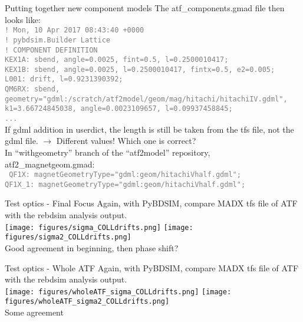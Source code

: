 \documentclass[xcolor={dvipsnames}]{beamer}
\begin{document}
\begin{frame}{Putting together new component models}
The atf\_components.gmad file then looks like:\\
\textcolor{Gray}{\texttt{\small ! Mon, 10 Apr 2017 08:43:40 +0000\\
! pybdsim.Builder Lattice \\
! COMPONENT DEFINITION\\
KEX1A: sbend, angle=0.0025, fint=0.5, l=0.2500010417;\\
KEX1B: sbend, angle=0.0025, l=0.2500010417, fintx=0.5, e2=0.005;\\
L001: drift, l=0.9231390392;\\
QM6RX: sbend, geometry="gdml:/scratch/atf2model/geom/mag/hitachi/hitachiIV.gdml", k1=3.66724845038, angle=0.0023109657, l=0.09937458845;\\
...
}}\\
If gdml addition in userdict, the length is still be taken from the tfs file, not the gdml file.
$\rightarrow$ Different values! Which one is correct?\\
\vspace*{0.2cm}
In ``withgeometry'' branch of the ``atf2model'' repository, atf2\_magnetgeom.gmad:\\
\textcolor{Gray}{\texttt{\small 
QF1X: magnetGeometryType="gdml:geom/hitachiVhalf.gdml";\\
QF1X\_1: magnetGeometryType="gdml:geom/hitachiVhalf.gdml";
}}
\end{frame}

\begin{frame}{Test optics - Final Focus}
Again, with PyBDSIM, compare MADX tfs file of ATF with the rebdsim analysis output.\\
 \texttt{[image: figures/sigma\_COLLdrifts.png]}
 \texttt{[image: figures/sigma2\_COLLdrifts.png]}\\
Good agreement in beginning, then phase shift?
\end{frame}

\begin{frame}{Test optics - Whole ATF}
Again, with PyBDSIM, compare MADX tfs file of ATF with the rebdsim analysis output.\\
 \texttt{[image: figures/wholeATF\_sigma\_COLLdrifts.png]}
 \texttt{[image: figures/wholeATF\_sigma2\_COLLdrifts.png]}\\
Some agreement 
\end{frame}
\end{document}
